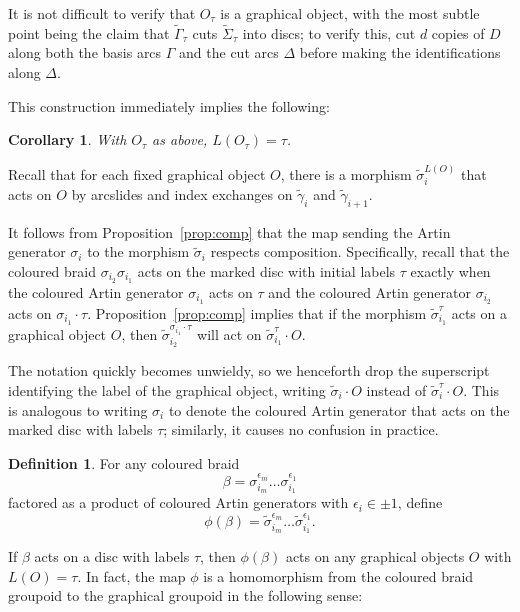 \documentclass{amsart}
\newtheorem{corollary}[theorem]{Corollary}
\theoremstyle{definition}
\newtheorem{definition}[theorem]{Definition}
\def\ws{\widetilde{\Sigma}}
\begin{document}
It is not difficult to verify that $O_\tau$ is a graphical object, with the most subtle point being the claim that $\widetilde{\Gamma}_\tau$ cuts $\ws_\tau$ into discs; to verify this, cut $d$ copies of $D$ along both the basis arcs $\Gamma$ and the cut arcs $\Delta$ before making the identifications along $\Delta$. 

This construction immediately implies the following:

\begin{corollary} With $O_\tau$ as above, $L(O_\tau)=\tau$.  
\end{corollary}

Recall that for each fixed graphical object $O$, there is a morphism $\widetilde{\sigma}^{L(O)}_i$ that acts on $O$ by arcslides and index exchanges on $\widetilde{\gamma}_i$ and $\widetilde{\gamma}_{i+1}$. 


It follows from Proposition~\ref{prop:comp} that the map sending the Artin generator $\sigma_i$ to the morphism $\widetilde{\sigma}_i$ respects composition.  Specifically, recall that the coloured braid $\sigma_{i_2}\sigma_{i_1}$ acts on the marked disc  with initial labels $\tau$ exactly when the coloured Artin generator $\sigma_{i_1}$ acts on $\tau$ and the coloured Artin generator $\sigma_{i_2}$ acts on $\sigma_{i_1}\cdot \tau$.  Proposition~\ref{prop:comp} implies that if the morphism $\widetilde{\sigma}^\tau_{i_1}$ acts on a graphical object $O$, then $\widetilde{\sigma}^{\sigma_{i_1}\cdot \tau}_{i_2}$ will act on $\widetilde{\sigma}_{i_1}^\tau\cdot O$.  

The notation quickly becomes unwieldy, so we henceforth drop the superscript  identifying the label of the graphical object,  writing $\widetilde{\sigma}_i \cdot O$ instead of $\widetilde{\sigma}_i^\tau \cdot O$.  This is analogous to writing $\sigma_i$ to denote the coloured Artin generator that acts on the marked disc with labels $\tau$;  similarly, it causes no confusion in practice.

\begin{definition}\label{def:homom} For any coloured braid \[\beta=\sigma^{\epsilon_m}_{i_m}\dots\sigma^{\epsilon_1}_{i_1}\] factored as a product of coloured Artin generators with $\epsilon_i\in \pm1$, define \[\phi(\beta)=\widetilde{\sigma}^{\epsilon_m}_{i_m}\dots \widetilde{\sigma}^{\epsilon_1}_{i_1}.\] 
\end{definition} 

If $\beta$ acts on a disc with labels $\tau$, then $\phi(\beta)$ acts on any graphical objects $O$ with $L(O)=\tau$.  In fact, the map $\phi$ is a homomorphism from the coloured braid groupoid to the graphical groupoid in the following sense:
\end{document}
